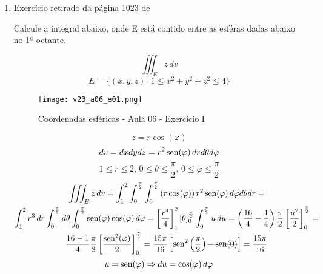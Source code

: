 \begin{enumerate}
	\item Exercício retirado da página 1023 de \cite{James_Stewart_calculo_v2}
	
	Calcule a integral abaixo, onde E está contido entre as esféras dadas abaixo no 1º octante.
	
	\begin{equation*}
		\iiint_E z\, dv
	\end{equation*}	
	\begin{equation*}
		E = \{(x,y,z) \,|\, 1 \leq x^2 + y^2 + z^2 \leq 4\}
	\end{equation*}
	
	\begin{figure}[htb]
		\caption{Coordenadas esféricas - Aula 06 - Exercício I}
		\label{v23_a06_e01}
		\centering
		\texttt{[image: v23\_a06\_e01.png]}		
	\end{figure}
	
	\begin{equation*}
		z = r\cos(\varphi)
	\end{equation*}
	\begin{equation*}
		dv = dxdydz = r^2\operatorname{sen}(\varphi)\, dr d\theta d\varphi
	\end{equation*}                                    
	\begin{equation*}
		1 \leq r \leq 2,\, 0 \leq \theta \leq \dfrac{\pi}{2},\, 0 \leq \varphi \leq \dfrac{\pi}{2}
	\end{equation*}
	\begin{gather*}
		\iiint_E z\, dv = \int_1^2 \int_0^{\frac{\pi}{2}} \int_0^{\frac{\pi}{2}} \left(r\cos(\varphi)\right)r^2\sen(\varphi)\, d\varphi d\theta dr =\\ \int_1^2 r^3\, dr \int_0^{\frac{\pi}{2}} d\theta \int_0^{\frac{\pi}{2}} \sen(\varphi)\cos(\varphi)\, d\varphi = \left[\dfrac{r^4}{4}\right]_1^2 \left[\theta\right]_0^{\frac{\pi}{2}} \int_0^{\frac{\pi}{2}} u\, du = \left(\dfrac{16}{4} - \dfrac{1}{4}\right)\dfrac{\pi}{2}\left[\dfrac{u^2}{2}\right]_0^{\frac{\pi}{2}} =\\ \dfrac{16 - 1}{4}\dfrac{\pi}{2}\left[\dfrac{\sen^2(\varphi)}{2}\right]_0^{\frac{\pi}{2}} = \dfrac{15\pi}{16}\left[\sen^2\left(\dfrac{\pi}{2}\right) \overstrike{- \sen(0)}\right] = \dfrac{15\pi}{16}
	\end{gather*}
	\begin{equation*}
		u = \operatorname{sen}(\varphi) \Rightarrow du = \cos(\varphi)\, d\varphi
	\end{equation*}	
\end{enumerate}